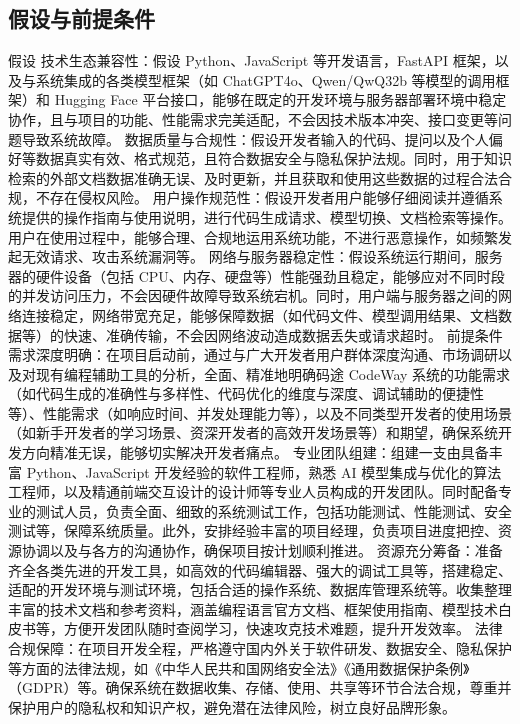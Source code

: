 \documentclass[
    report,     %
    oneside,    %
    UTF8,       %
    zihao=-4    %
]{config} %
\begin{document}
\subsection{假设与前提条件}
假设
技术生态兼容性：假设 Python、JavaScript 等开发语言，FastAPI 框架，以及与系统集成的各类模型框架（如 ChatGPT4o、Qwen/QwQ32b 等模型的调用框架）和 Hugging Face 平台接口，能够在既定的开发环境与服务器部署环境中稳定协作，且与项目的功能、性能需求完美适配，不会因技术版本冲突、接口变更等问题导致系统故障。
数据质量与合规性：假设开发者输入的代码、提问以及个人偏好等数据真实有效、格式规范，且符合数据安全与隐私保护法规。同时，用于知识检索的外部文档数据准确无误、及时更新，并且获取和使用这些数据的过程合法合规，不存在侵权风险。
用户操作规范性：假设开发者用户能够仔细阅读并遵循系统提供的操作指南与使用说明，进行代码生成请求、模型切换、文档检索等操作。用户在使用过程中，能够合理、合规地运用系统功能，不进行恶意操作，如频繁发起无效请求、攻击系统漏洞等。
网络与服务器稳定性：假设系统运行期间，服务器的硬件设备（包括 CPU、内存、硬盘等）性能强劲且稳定，能够应对不同时段的并发访问压力，不会因硬件故障导致系统宕机。同时，用户端与服务器之间的网络连接稳定，网络带宽充足，能够保障数据（如代码文件、模型调用结果、文档数据等）的快速、准确传输，不会因网络波动造成数据丢失或请求超时。
前提条件
需求深度明确：在项目启动前，通过与广大开发者用户群体深度沟通、市场调研以及对现有编程辅助工具的分析，全面、精准地明确码途 CodeWay 系统的功能需求（如代码生成的准确性与多样性、代码优化的维度与深度、调试辅助的便捷性等）、性能需求（如响应时间、并发处理能力等），以及不同类型开发者的使用场景（如新手开发者的学习场景、资深开发者的高效开发场景等）和期望，确保系统开发方向精准无误，能够切实解决开发者痛点。
专业团队组建：组建一支由具备丰富 Python、JavaScript 开发经验的软件工程师，熟悉 AI 模型集成与优化的算法工程师，以及精通前端交互设计的设计师等专业人员构成的开发团队。同时配备专业的测试人员，负责全面、细致的系统测试工作，包括功能测试、性能测试、安全测试等，保障系统质量。此外，安排经验丰富的项目经理，负责项目进度把控、资源协调以及与各方的沟通协作，确保项目按计划顺利推进。
资源充分筹备：准备齐全各类先进的开发工具，如高效的代码编辑器、强大的调试工具等，搭建稳定、适配的开发环境与测试环境，包括合适的操作系统、数据库管理系统等。收集整理丰富的技术文档和参考资料，涵盖编程语言官方文档、框架使用指南、模型技术白皮书等，方便开发团队随时查阅学习，快速攻克技术难题，提升开发效率。
法律合规保障：在项目开发全程，严格遵守国内外关于软件研发、数据安全、隐私保护等方面的法律法规，如《中华人民共和国网络安全法》《通用数据保护条例》（GDPR）等。确保系统在数据收集、存储、使用、共享等环节合法合规，尊重并保护用户的隐私权和知识产权，避免潜在法律风险，树立良好品牌形象。
\end{document}
